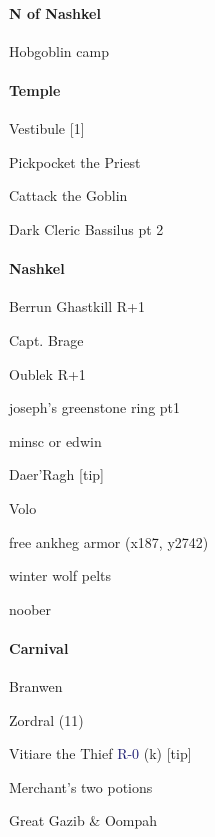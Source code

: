 \documentclass[10pt,a4,twoside]{book}
\begin{document}
\begin{multicols}{3}
\paragraph*{N of Nashkel}
\begin{trivlist}
\item Hobgoblin camp
\end{trivlist}

\paragraph*{Temple}
\begin{trivlist}
\item Vestibule [1]
\item Pickpocket the Priest
\item Cattack the Goblin
\item Dark Cleric Bassilus pt 2  \label{temple} %
\end{trivlist}

\paragraph*{Nashkel}
\begin{trivlist}
\item Berrun Ghastkill {\textcolor{OliveGreen}{R+1}}   \label{berrun} %
\item Capt. Brage \label{priest} %
\item Oublek {\textcolor{OliveGreen}{R+1}}   \label{oublek} %
\item joseph's greenstone ring pt1 \label{joseph}  \label{joseph} %
\item minsc or edwin%
\item Daer'Ragh [tip]
\item Volo   \label{volo} %
\item free ankheg armor (x187, y2742)
\item winter wolf pelts
\item noober
\end{trivlist}

\paragraph*{Carnival}
\begin{trivlist}
\item Branwen
\item Zordral (11)   \label{zordral} %
\item Vitiare the Thief \textcolor{MidnightBlue}{R-0} (k) [tip]
\item Merchant's two potions
\item Great Gazib \& Oompah
\end{trivlist}


\end{multicols}
\end{document}
